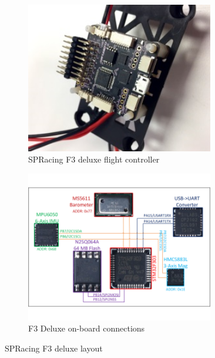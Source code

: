 \par
\begin{figure}[htbp]
\begin{subfigure}{0.5\textwidth}
\centering
\includegraphics[width=0.9\textwidth]{figs/f3-deluxe}
\caption{SPRacing F3 deluxe flight controller}
\end{subfigure}
\begin{subfigure}{0.5\textwidth}
\centering
\includegraphics[width=0.9\textwidth]{figs/f3-deluxe-board}
\caption{F3 Deluxe on-board connections}
\label{fig:f3-deluxe-board}
\end{subfigure}
\caption{SPRacing F3 deluxe layout}
\label{fig:f3-deluxe-layout}
\vspace{-10pt}
\end{figure}
